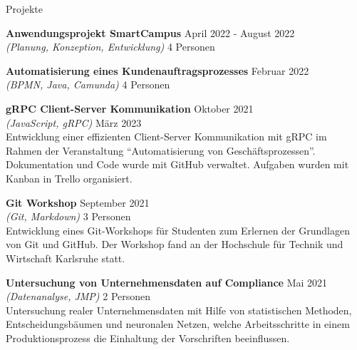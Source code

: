 \documentclass{resume} %
\begin{document}
\begin{rSection}{Projekte}
\begin{adjustwidth}{0.5cm}{}
        \item \textbf{Anwendungsprojekt SmartCampus} \hfill {April 2022 - August 2022} \\
        \textit{(Planung, Konzeption, Entwicklung)} \hfill {4 Personen} \\
        
        \item \textbf{Automatisierung eines Kundenauftragsprozesses} \hfill {Februar 2022} \\
        \textit{(BPMN, Java, Camunda)} \hfill {4 Personen}\\
    
        \item \textbf{gRPC Client-Server Kommunikation} \hfill {Oktober 2021} \\
        \textit{(JavaScript, gRPC)} \hfill {März 2023}\\
        {Entwicklung einer effizienten Client-Server Kommunikation mit gRPC im Rahmen der Veranstaltung “Automatisierung von Geschäftsprozessen”.
        Dokumentation und Code wurde mit GitHub verwaltet. Aufgaben wurden mit Kanban in Trello organisiert.}
        
        \item \textbf{Git Workshop} \hfill {September 2021} \\
        \textit{(Git, Markdown)} \hfill {3 Personen}\\
        {Entwicklung eines Git-Workshops für Studenten zum Erlernen der Grundlagen von Git und GitHub.
        Der Workshop fand an der Hochschule für Technik und Wirtschaft Karlsruhe statt.}
    
        \item \textbf{Untersuchung von Unternehmensdaten auf Compliance} \hfill {Mai 2021} \\
        \textit{(Datenanalyse, JMP)} \hfill {2 Personen} \\
        {Untersuchung realer Unternehmensdaten mit Hilfe von statistischen Methoden, Entscheidungsbäumen und neuronalen Netzen,
        welche Arbeitsschritte in einem Produktionsprozess die Einhaltung der Vorschriften beeinflussen.}
   

\end{adjustwidth}
\end{rSection}
\end{document}
